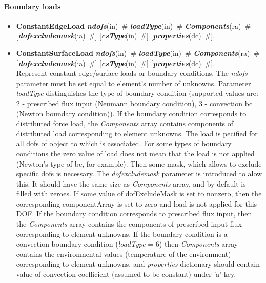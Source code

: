 \documentclass[draft]{article}
\newcommand{\param}[1]{{\em #1}}
\newcommand{\keywordnotype}[1]{\mbox{{\it{\bf{#1}}}}}
\newcommand{\keyword}[2]{\mbox{{\keywordnotype{#1}\tiny (#2)}}}
\newcommand{\entKeywordInst}[1]{\mbox{{\bf{{#1}}}}}
\newcommand{\field}[2]{\mbox{\keyword{#1}{#2}~\#}}
\newcommand{\optField}[2]{\mbox{[\field{#1}{#2}]}}
\begin{document}
\paragraph{Boundary loads}
\begin{itemize}
\item \entKeywordInst{ConstantEdgeLoad} \field{ndofs}{in} \field{loadType}{in}
\field{Components}{ra}\\ \optField{dofexcludemask}{ia} \optField{csType}{in} \optField{properties}{dc}.
\item \entKeywordInst{ConstantSurfaceLoad} \field{ndofs}{in} \field{loadType}{in}
\field{Components}{ra}\\ \optField{dofexcludemask}{ia} \optField{csType}{in} \optField{properties}{dc}.\\[2mm]
Represent constant edge/surface loads or boundary conditions. The \param{ndofs} parameter must be set
equal to element's number of unknowns. Parameter \param{loadType}
distinguishes the type of boundary condition (supported values are:
2 - prescribed flux input (Neumann boundary condition), 3 - convection bc (Newton boundary condition)). 
If the boundary condition corresponds to distributed force load, the
\param{Components} array contains components of distributed load
corresponding to element unknowns.
The load is pecified for all dofs of object to which is associated.
For some types of boundary conditions the zero value of load does not mean
that the load is not applied (Newton's type of bc, for example). Then 
some mask, which allows to exclude specific dofs is necessary. 
The \param{dofexcludemask} parameter is introduced to alow this.
It should have the same size as \param{Components} array, and by
default is filled with zeroes. If some value of dofExcludeMask is set
to nonzero, then the corresponding componentArray 
is set to zero and load is not applied for this DOF.
If the boundary condition corresponds to prescribed flux input, then 
the \param{Components} array contains the components of prescribed
input flux corresponding to element unknowns.
If the boundary condition is a convection boundary condition
(\param{loadType} = 6) then \param{Components} array contains the
environmental values (temperature of the environment) corresponding to
element unknowns, and \param{properties} dictionary should contain
value of convection coefficient (assumed to be constant) under 'a'
key.



\end{itemize}
\end{document}
